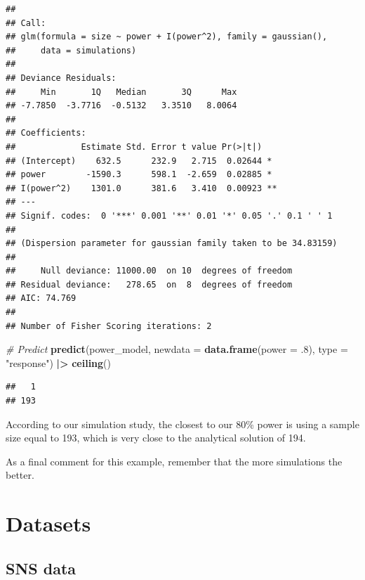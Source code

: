 \documentclass[]{book}
\newenvironment{Shaded}{\begin{snugshade}}{\end{snugshade}}
\newcommand{\CommentTok}[1]{\textcolor[rgb]{0.56,0.35,0.01}{\textit{#1}}}
\newcommand{\DataTypeTok}[1]{\textcolor[rgb]{0.13,0.29,0.53}{#1}}
\newcommand{\ErrorTok}[1]{\textcolor[rgb]{0.64,0.00,0.00}{\textbf{#1}}}
\newcommand{\FloatTok}[1]{\textcolor[rgb]{0.00,0.00,0.81}{#1}}
\newcommand{\KeywordTok}[1]{\textcolor[rgb]{0.13,0.29,0.53}{\textbf{#1}}}
\newcommand{\NormalTok}[1]{#1}
\newcommand{\OperatorTok}[1]{\textcolor[rgb]{0.81,0.36,0.00}{\textbf{#1}}}
\newcommand{\StringTok}[1]{\textcolor[rgb]{0.31,0.60,0.02}{#1}}
\begin{document}
\begin{verbatim}
## 
## Call:
## glm(formula = size ~ power + I(power^2), family = gaussian(), 
##     data = simulations)
## 
## Deviance Residuals: 
##     Min       1Q   Median       3Q      Max  
## -7.7850  -3.7716  -0.5132   3.3510   8.0064  
## 
## Coefficients:
##             Estimate Std. Error t value Pr(>|t|)   
## (Intercept)    632.5      232.9   2.715  0.02644 * 
## power        -1590.3      598.1  -2.659  0.02885 * 
## I(power^2)    1301.0      381.6   3.410  0.00923 **
## ---
## Signif. codes:  0 '***' 0.001 '**' 0.01 '*' 0.05 '.' 0.1 ' ' 1
## 
## (Dispersion parameter for gaussian family taken to be 34.83159)
## 
##     Null deviance: 11000.00  on 10  degrees of freedom
## Residual deviance:   278.65  on  8  degrees of freedom
## AIC: 74.769
## 
## Number of Fisher Scoring iterations: 2
\end{verbatim}

\begin{Shaded}
\begin{Highlighting}[]
\CommentTok{# Predict}
\KeywordTok{predict}\NormalTok{(power_model, }\DataTypeTok{newdata =} \KeywordTok{data.frame}\NormalTok{(}\DataTypeTok{power =} \FloatTok{.8}\NormalTok{), }\DataTypeTok{type =} \StringTok{"response"}\NormalTok{) }\OperatorTok{|}\ErrorTok{>}
\StringTok{  }\KeywordTok{ceiling}\NormalTok{()}
\end{Highlighting}
\end{Shaded}

\begin{verbatim}
##   1 
## 193
\end{verbatim}

According to our simulation study, the closest to our 80\% power is using a sample size equal to 193, which is very close to the analytical solution of 194.

As a final comment for this example, remember that the more simulations the better.

\cleardoublepage

\hypertarget{appendix-appendix}{%
\appendix}


\hypertarget{datasets-1}{%
\chapter{Datasets}\label{datasets-1}}

\hypertarget{sns-data}{%
\section{SNS data}\label{sns-data}}
\end{document}
